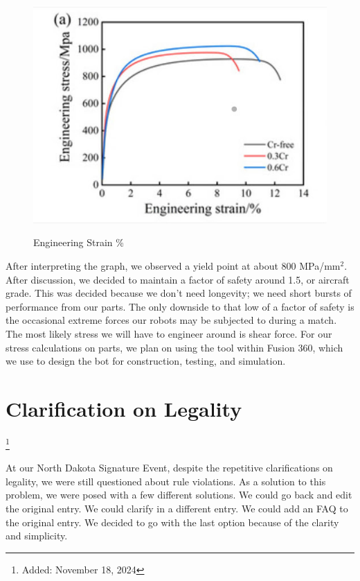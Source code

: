 \begin{figure}[H]
    \centering
    \includegraphics[width=0.5\linewidth]{images/CNC Machining Graph.jpg}
    \caption{Engineering Strain \%}
    \label{fig:cnc-machining-graph}
    \cite{cryst13081287}
\end{figure}

After interpreting the graph, we observed a yield point at about 800 MPa/mm\(^2\). After discussion, we decided to maintain a factor of safety around 1.5, or aircraft grade. This was decided because we don’t need longevity; we need short bursts of performance from our parts. The only downside to that low of a factor of safety is the occasional extreme forces our robots may be subjected to during a match. The most likely stress we will have to engineer around is shear force. For our stress calculations on parts, we plan on using the tool within Fusion 360, which we use to design the bot for construction, testing, and simulation.

\section*{Clarification on Legality}\footnote{Added: November 18, 2024}

At our North Dakota Signature Event, despite the repetitive clarifications on legality, we were still questioned about rule violations. As a solution to this problem, we were posed with a few different solutions. We could go back and edit the original entry. We could clarify in a different entry. We could add an FAQ to the original entry. We decided to go with the last option because of the clarity and simplicity. 

